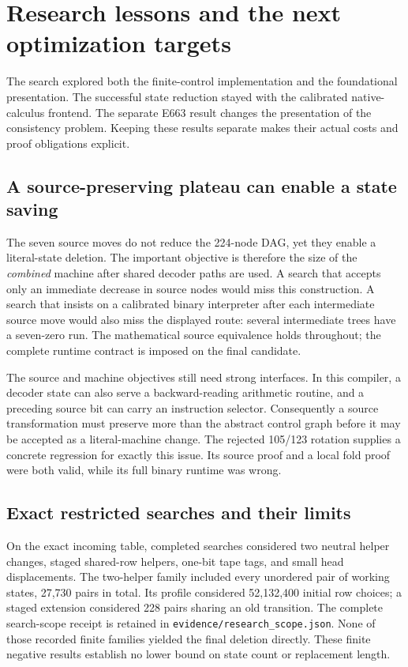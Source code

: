 \section{Research lessons and the next optimization targets}
\label{sec:search}

The search explored both the finite-control implementation and the
foundational presentation. The successful state reduction stayed with
the calibrated native-calculus frontend. The separate E663 result changes
the presentation of the consistency problem. Keeping these results
separate makes their actual costs and proof obligations explicit.

\subsection{A source-preserving plateau can enable a state saving}

The seven source moves do not reduce the 224-node DAG, yet they enable a
literal-state deletion. The important objective is therefore the size of
the \emph{combined} machine after shared decoder paths are used. A search
that accepts only an immediate decrease in source nodes would miss this
construction. A search that insists on a calibrated binary interpreter
after each intermediate source move would also miss the displayed route:
several intermediate trees have a seven-zero run. The mathematical source
equivalence holds throughout; the complete runtime contract is imposed
on the final candidate.

The source and machine objectives still need strong interfaces. In this
compiler, a decoder state can also serve a backward-reading arithmetic
routine, and a preceding source bit can carry an instruction selector.
Consequently a source transformation must preserve more than the abstract
control graph before it may be accepted as a literal-machine change.
The rejected 105/123 rotation supplies a concrete regression for exactly
this issue. Its source proof and a local fold proof were both valid,
while its full binary runtime was wrong.

\subsection{Exact restricted searches and their limits}

On the exact incoming table, completed searches considered two neutral
helper changes, staged shared-row helpers, one-bit tape tags, and small
head displacements. The two-helper family included every unordered pair
of working states, 27,730 pairs in total. Its profile considered
52,132,400 initial row choices; a staged extension considered 228 pairs
sharing an old transition. The complete search-scope receipt is retained
in \texttt{evidence/research\_scope.json}. None of those recorded finite
families yielded the final deletion directly. These finite negative
results establish no lower bound on state count or replacement length.

